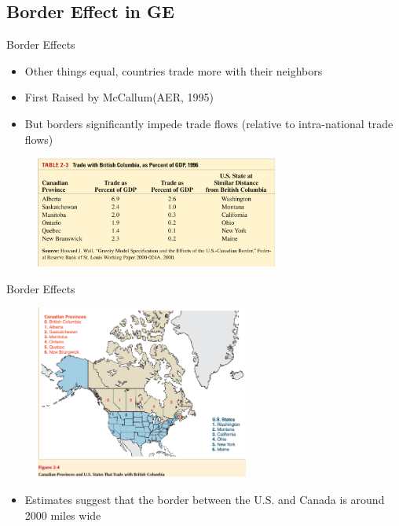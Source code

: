 \documentclass[10pt,hyperref={CJKbookmarks=true},xcolor=dvipsnames,aspectratio=169]{beamer}
\begin{document}
\subsection{Border Effect in GE}
\begin{frame}{Border Effects}

\begin{itemize}
\item Other things equal, countries trade more with their neighbors
\item First Raised by McCallum(AER, 1995)
\item But borders significantly impede trade flows (relative to intra-national
trade flows) 
\end{itemize}

\begin{figure}


\begin{centering}
\includegraphics[width=8cm]{fig/gravity/tra12}
\par\end{centering}

\end{figure}


\end{frame}

\begin{frame}{Border Effects}


\begin{figure}
\begin{centering}
\includegraphics[width=7cm]{fig/gravity/tra13}
\par\end{centering}

\end{figure}

\begin{itemize}
\item Estimates suggest that the border between the U.S. and Canada is around
2000 miles wide
\end{itemize}
\end{frame}
\end{document}
